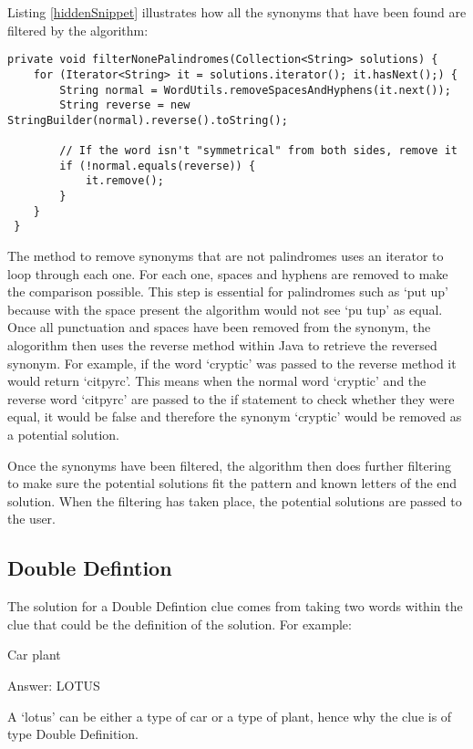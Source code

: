 Listing \ref{hiddenSnippet} illustrates how all the synonyms that have
 been found are filtered by the algorithm: 

\begin{lstlisting}[caption={INSERT CAPTION},
                   label=hiddenSnippet] 
 private void filterNonePalindromes(Collection<String> solutions) {
	for (Iterator<String> it = solutions.iterator(); it.hasNext();) {
		String normal = WordUtils.removeSpacesAndHyphens(it.next());
		String reverse = new StringBuilder(normal).reverse().toString();

		// If the word isn't "symmetrical" from both sides, remove it
		if (!normal.equals(reverse)) {
			it.remove();
		}
	}
 }
\end{lstlisting}

The method to remove synonyms that are not palindromes uses an 
iterator to loop through each one. For each one, spaces and hyphens 
are removed to make the comparison possible. This step is essential for 
palindromes such as `put up' because with the space present the 
algorithm would not see `pu tup' as equal. Once all punctuation and
spaces have been removed from the synonym, the alogorithm then 
uses the reverse method within Java to retrieve the reversed synonym. 
For example, if the word `cryptic' was passed to the reverse method 
it would return `citpyrc'. This means when the normal word `cryptic' 
and the reverse word `citpyrc' are passed to the if statement to check 
whether they were equal, it would be false and therefore the synonym 
`cryptic' would be removed as a potential solution.

Once the synonyms have been filtered, the algorithm then does further 
filtering to make sure the potential solutions fit the pattern and known 
letters of the end solution. When the filtering has taken place, the 
potential solutions are passed to the user.

\subsection{Double Defintion}

The solution for a Double Defintion clue comes from taking two 
words within the clue that could be the definition of the solution. 
For example:

Car plant

Answer: LOTUS

A `lotus' can be either a type of car or a type of plant, hence 
why the clue is of type Double Definition. 

